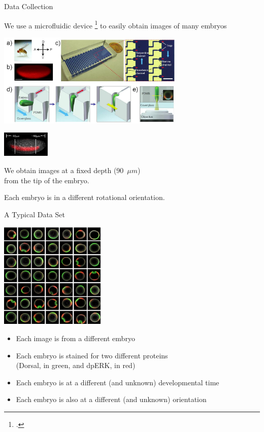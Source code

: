 \documentclass[10pt,aspectratio=169]{beamer}
\begin{document}
\begin{frame}{Data Collection}

\begin{center}
We use a microfluidic device \footcite{chung2010microfluidic} to easily obtain images of many embryos

\includegraphics[width=3.5in]{drosophila_imaging_setup}

\vspace{0.15in}

\begin{minipage}[b]{1.1in}
\hfill
\includegraphics[width=0.9in]{imaging_depth}
\end{minipage}
%
\begin{minipage}[b]{0.65\textwidth}
We obtain images at a fixed depth (90~$\mu m$) \\from the tip of the embryo.

Each embryo is in a different rotational orientation.
\end{minipage}

\end{center}

\end{frame}

\begin{frame}{A Typical Data Set}
\begin{center}
\includegraphics[width=2in]{fig2a}
\end{center}

\begin{itemize}
\item Each image is from a different embryo
\item Each embryo is stained for two different proteins\\ (Dorsal, in green, and dpERK, in red)
\item Each embryo is at a different (and unknown) developmental time
\item Each embryo is also at a different (and unknown) orientation
\end{itemize}
\end{frame}
\end{document}
